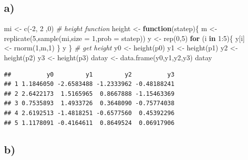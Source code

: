 \documentclass[
]{article}
\newenvironment{Shaded}{\begin{snugshade}}{\end{snugshade}}
\newcommand{\AttributeTok}[1]{\textcolor[rgb]{0.77,0.63,0.00}{#1}}
\newcommand{\CommentTok}[1]{\textcolor[rgb]{0.56,0.35,0.01}{\textit{#1}}}
\newcommand{\ControlFlowTok}[1]{\textcolor[rgb]{0.13,0.29,0.53}{\textbf{#1}}}
\newcommand{\DecValTok}[1]{\textcolor[rgb]{0.00,0.00,0.81}{#1}}
\newcommand{\FunctionTok}[1]{\textcolor[rgb]{0.00,0.00,0.00}{#1}}
\newcommand{\NormalTok}[1]{#1}
\newcommand{\OtherTok}[1]{\textcolor[rgb]{0.56,0.35,0.01}{#1}}
\newcommand{\SpecialCharTok}[1]{\textcolor[rgb]{0.00,0.00,0.00}{#1}}
\begin{document}
\hypertarget{a-1}{%
\subsection{a)}\label{a-1}}

\begin{Shaded}
\begin{Highlighting}[]
\NormalTok{mi }\OtherTok{\textless{}{-}} \FunctionTok{c}\NormalTok{(}\SpecialCharTok{{-}}\DecValTok{2}\NormalTok{, }\DecValTok{2}\NormalTok{ ,}\DecValTok{0}\NormalTok{)}
\CommentTok{\# height function}
\NormalTok{height }\OtherTok{\textless{}{-}} \ControlFlowTok{function}\NormalTok{(statep)\{}
\NormalTok{  m }\OtherTok{\textless{}{-}} \FunctionTok{replicate}\NormalTok{(}\DecValTok{5}\NormalTok{,}\FunctionTok{sample}\NormalTok{(mi,}\AttributeTok{size =} \DecValTok{1}\NormalTok{,}\AttributeTok{prob =}\NormalTok{ statep))}
\NormalTok{  y }\OtherTok{\textless{}{-}} \FunctionTok{rep}\NormalTok{(}\DecValTok{0}\NormalTok{,}\DecValTok{5}\NormalTok{)}
  \ControlFlowTok{for}\NormalTok{ (i }\ControlFlowTok{in} \DecValTok{1}\SpecialCharTok{:}\DecValTok{5}\NormalTok{)\{}
\NormalTok{    y[i] }\OtherTok{\textless{}{-}} \FunctionTok{rnorm}\NormalTok{(}\DecValTok{1}\NormalTok{,m,}\DecValTok{1}\NormalTok{)}
\NormalTok{  \}}
\NormalTok{  y}
\NormalTok{\}}
\CommentTok{\# get height}
\NormalTok{y0 }\OtherTok{\textless{}{-}} \FunctionTok{height}\NormalTok{(p0)}
\NormalTok{y1 }\OtherTok{\textless{}{-}} \FunctionTok{height}\NormalTok{(p1)}
\NormalTok{y2 }\OtherTok{\textless{}{-}} \FunctionTok{height}\NormalTok{(p2)}
\NormalTok{y3 }\OtherTok{\textless{}{-}} \FunctionTok{height}\NormalTok{(p3)}
\NormalTok{datay }\OtherTok{\textless{}{-}} \FunctionTok{data.frame}\NormalTok{(y0,y1,y2,y3)}
\NormalTok{datay}
\end{Highlighting}
\end{Shaded}

\begin{verbatim}
##          y0         y1         y2          y3
## 1 1.1846050 -2.6583488 -1.2333962 -0.48188241
## 2 2.6422173  1.5165965  0.8667888 -1.15463369
## 3 0.7535893  1.4933726  0.3648090 -0.75774038
## 4 2.6192513 -1.4818251 -0.6577560  0.45392296
## 5 1.1178091 -0.4164611  0.8649524  0.06917906
\end{verbatim}

\hypertarget{b-1}{%
\subsection{b)}\label{b-1}}
\end{document}
